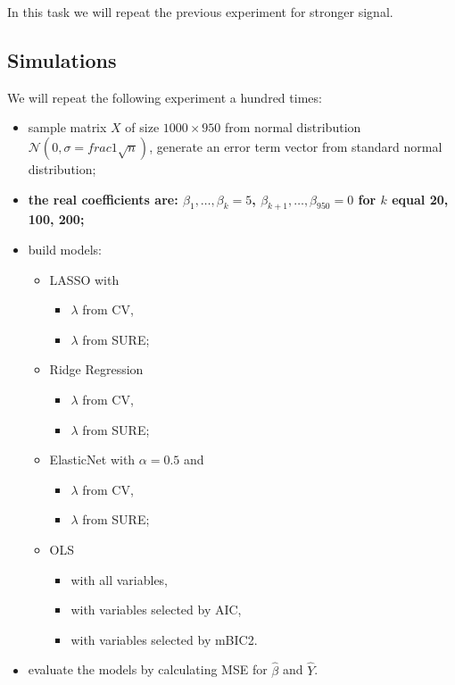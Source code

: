 \documentclass[
]{article}
\begin{document}
In this task we will repeat the previous experiment for stronger signal.

\hypertarget{simulations-2}{%
\subsection{Simulations}\label{simulations-2}}

We will repeat the following experiment a hundred times:

\begin{itemize}
\item
  sample matrix \(X\) of size \(1000 \times 950\) from normal
  distribution \(\mathcal N (0, \sigma = frac 1 {\sqrt n})\), generate
  an error term vector from standard normal distribution;
\item
  \textbf{the real coefficients are: \(\beta_1, \ldots, \beta_k = 5\),
  \(\beta_{k+1}, \ldots, \beta_{950} = 0\) for \(k\) equal 20, 100,
  200;}
\item
  build models:

  \begin{itemize}
  \item
    LASSO with

    \begin{itemize}
    \item
      \(\lambda\) from CV,
    \item
      \(\lambda\) from SURE;
    \end{itemize}
  \item
    Ridge Regression

    \begin{itemize}
    \item
      \(\lambda\) from CV,
    \item
      \(\lambda\) from SURE;
    \end{itemize}
  \item
    ElasticNet with \(\alpha=0.5\) and

    \begin{itemize}
    \item
      \(\lambda\) from CV,
    \item
      \(\lambda\) from SURE;
    \end{itemize}
  \item
    OLS

    \begin{itemize}
    \item
      with all variables,
    \item
      with variables selected by AIC,
    \item
      with variables selected by mBIC2.
    \end{itemize}
  \end{itemize}
\item
  evaluate the models by calculating MSE for \(\hat\beta\) and
  \(\hat Y\).
\end{itemize}
\end{document}
